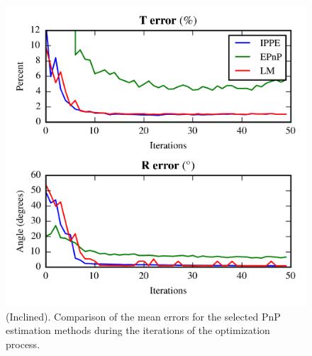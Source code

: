 \documentclass[letterpaper, 10 pt, conference]{ieeeconf}  %
\begin{document}
	\begin{figure}[t]
		\begin{center}
			\includegraphics[width=\columnwidth]{img/pose_together_inclined.png}
			\caption{\label{fig:IN_pnp_results_global}\small  (Inclined). Comparison of the mean errors for the selected PnP estimation methods during the iterations of the optimization process.}
		\end{center}
		\vspace{-0.5cm}
	\end{figure}
	
\end{document}
